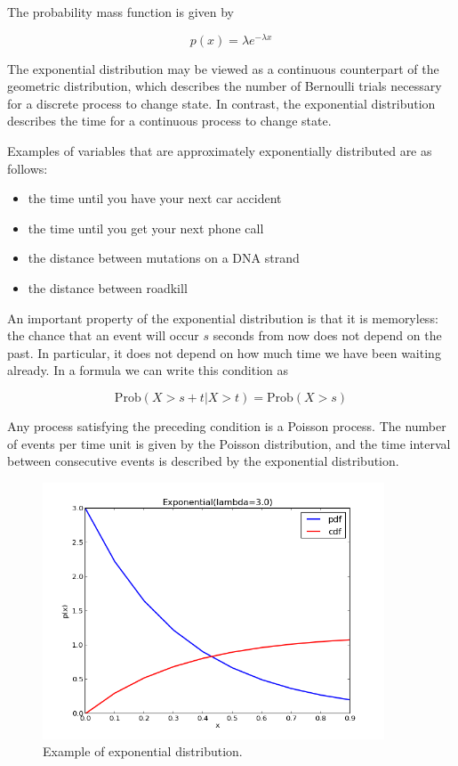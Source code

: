 \documentclass[justified,sixbynine]{tufte-book}
\theoremstyle{plain}%
\theoremstyle{definition}
\theoremstyle{remark}
\begin{document}
\begin{fullwidth}
The probability mass function is given by

\begin{equation}
p(x)=\lambda e^{-\lambda x}
\end{equation}

The exponential distribution may be viewed as a continuous counterpart of
the geometric distribution, which describes the number of Bernoulli trials
necessary for a discrete process to change state. In contrast, the
exponential distribution describes the time for a continuous process to
change state.

Examples of variables that are approximately exponentially distributed are as follows:

\begin{itemize}
\item  the time until you have your next car accident

\item  the time until you get your next phone call

\item  the distance between mutations on a DNA strand

\item  the distance between roadkill
\end{itemize}

An important property of the exponential distribution is that it is
memoryless: the chance that an event will occur $s$ seconds from now does not depend on the past. In particular, it does not depend on how much time we have been waiting already. In a formula we can write this condition as

\begin{equation}
\textrm{Prob}(X>s+t|X>t)=\textrm{Prob}(X>s)
\end{equation}

Any process satisfying the preceding condition is a Poisson process. The number of events per time unit is given by the Poisson distribution, and the time interval between consecutive events is described by the exponential distribution.

\begin{figure}[ht]
\centering\includegraphics[width=4in]{images/exponential.png}
\caption{Example of exponential distribution.}
\end{figure}


\end{fullwidth}
\end{document}
